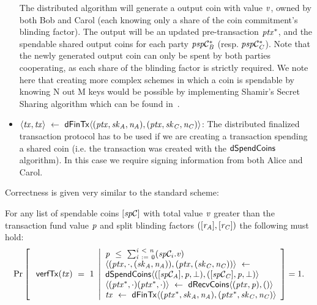 \begin{definition}
\begin{itemize}
        The distributed algorithm will generate a output coin with value $\mathit{v}$, owned by both Bob and Carol (each knowing only a share of the coin commitment's blinding factor).
        The output will be an updated pre-transaction $\mathit{ptx}^*$, and the spendable shared output coins for each party $\mathit{psp}\mathcal{C}_{\mathit{B}}^*$ (resp. $\mathit{psp}\mathcal{C}_{\mathit{C}}^*$).
        Note that the newly generated output coin can only be spent by both parties cooperating, as each share of the blinding factor is strictly required.
        We note here that creating more complex schemes in which a coin is spendable by knowing N out M keys would be possible by implementing Shamir's Secret Sharing algorithm which can be found in~\cite{shamir1979share}.
        \item $\langle \mathit{tx}, \mathit{tx} \rangle ~\leftarrow~ \mathsf{dFinTx} \langle(\mathit{ptx},\mathit{sk}_{\mathit{A}},\mathit{\mathit{n}_{\mathit{A}}}),(\mathit{ptx},\mathit{sk}_{\mathit{C}},\mathit{\mathit{n}_{\mathit{C}}})\rangle$: The distributed finalized transaction protocol has to be used if we are creating a transaction spending a shared coin (i.e. the transaction was created with the $\mathsf{dSpendCoins}$ algorithm).
        In this case we require signing information from both Alice and Carol.
    \end{itemize}
\end{definition}

Correctness is given very similar to the standard scheme:

\begin{definition}
    \label{def:atom:ext-tx-scheme-correctness}
    For any list of spendable coins $[\mathit{sp}\mathcal{C}]$ with total value $\mathit{v}$ greater than the transaction fund value $\mathit{p}$ and split blinding factors $([\mathit{r}_{\mathit{A}}], [\mathit{r}_{\mathit{C}}])$ the following must hold:
    \[
        \Pr\left[
        \begin{array}{c}
            \: \mathsf{verfTx}(\mathit{tx}) ~=~ 1
        \end{array}
        \middle\vert
        \begin{array}{l}
            \mathit{p} ~\leq~ \sum_{\mathit{i} ~:=~ 0}^{\mathit{i} ~<~ \mathit{n}}(\mathit{sp}\mathcal{C}_{i}.\mathit{v}) \\
            \langle (\mathit{ptx}, \cdot, (\mathit{sk}_{\mathit{A}}, \mathit{\mathit{n}_{\mathit{A}}})), (\mathit{ptx}, (\mathit{sk}_{\mathit{C}}, \mathit{\mathit{n}_{\mathit{C}}})) \rangle ~\leftarrow~ \\
            \mathsf{dSpendCoins} \langle ([\mathit{sp}\mathcal{C}_{\mathit{A}}],\mathit{p},\bot), ([\mathit{sp}\mathcal{C}_{\mathit{C}}],\mathit{p},\bot) \rangle \\
            \langle (\mathit{ptx}^*, \cdot)(\mathit{ptx}^*, \cdot) \rangle ~\leftarrow~ \mathsf{dRecvCoins} \langle(\mathit{ptx},\mathit{p}), () \rangle \\
            \mathit{tx} ~\leftarrow~ \mathsf{dFinTx} \langle(\mathit{ptx}^*,\mathit{sk}_{\mathit{A}},\mathit{\mathit{n}_{\mathit{A}}}),(\mathit{ptx}^*,\mathit{sk}_{\mathit{C}},\mathit{\mathit{n}_{\mathit{C}}})\rangle
        \end{array}
        \right]=1.
    \]
\end{definition}

